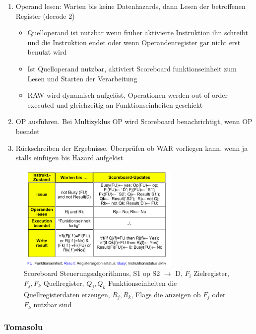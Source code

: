 \begin{itemize}
\begin{enumerate}
			\item
				Operand lesen: Warten bis keine Datenhazards, dann Lesen der betroffenen Register (decode 2)
				\begin{itemize}
					\item
						Quelloperand ist nutzbar wenn früher aktivierte Instruktion ihn schreibt und die Instruktion endet oder wenn Operandenregister gar nicht erst benutzt wird
					\item
						Ist Quelloperand nutzbar, aktiviert Scoreboard funktionseinheit zum Lesen und Starten der Verarbeitung
					\item
						RAW wird dynamisch aufgelöst, Operationen werden out-of-order executed und gleichzeitig an Funktionseinheiten geschickt
				\end{itemize}
			\item
				OP ausführen. Bei Multizyklus OP wird Scoreboard benachrichtigt, wenn OP beendet
			\item
				Rückschreiben der Ergebnisse. Überprüfen ob WAR vorliegen kann, wenn ja stalls einfügen bis Hazard aufgelöst

		\end{enumerate}
						\begin{figure}[hpbt]
							\centering
							\includegraphics[width=0.7\textwidth]{img/scoreboard.png}
							\caption{Scoreboard Steuerungsalgorithmus, S1 op S2 $\rightarrow$ D, $F_i$ Zielregister, $F_j,F_k$ Quellregister, $Q_j,Q_k$ Funktionseinheiten die Quellregisterdaten erzeugen, $R_j,R_k$, Flags die anzeigen ob $F_j$ oder $F_k$ nutzbar sind}
							\label{fig:hazards}
						\end{figure}
\end{itemize}
\subsubsection{Tomasolu}
\label{tomasolu}

